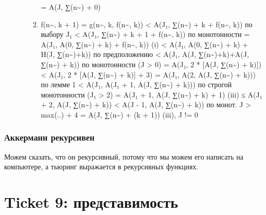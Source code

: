 \documentclass[11pt]{article}
\begin{document}
\begin{itemize}
\begin{enumerate}
\begin{enumerate}
= A(J, ∑(n\textasciitilde{}) + 0)
\item f(n\textasciitilde{}, k + 1)
= g(n\textasciitilde{}, k, f(n\textasciitilde{}, k))
< A(J₁, ∑(n\textasciitilde{}) + k + f(n\textasciitilde{}, k))        по выбору J₁
< A(J₁, ∑(n\textasciitilde{}) + k + 1 + f(n\textasciitilde{}, k))    по монотонности
= A(J₁, A(0, ∑(n\textasciitilde{}) + k) + f(n\textasciitilde{}, k))  (i)
< A(J₁, A(0, ∑(n\textasciitilde{}) + k) + H(J, ∑(n\textasciitilde{})+k)) по предположению
< A(J₁, A(J, ∑(n\textasciitilde{})+k)+A(J, ∑(n\textasciitilde{}) + k)) по монотонности (J > 0)
= A(J₁, 2 * [A(J, ∑(n\textasciitilde{}) + k)])
< A(J₁, 2 * [A(J, ∑(n\textasciitilde{}) + k)] + 3)
= A(J₁, A(2, A(J, ∑(n\textasciitilde{}) + k)))        по лемме 1
< A(J₁, A(J₁ + 1, A(J, ∑(n\textasciitilde{}) + k)))   по строгой монотонности (J₁ > 2)
= A(J₁ + 1, A(J, ∑(n\textasciitilde{}) + k) + 1)      (iii)
≤ A(J₁ + 2, A(J, ∑(n\textasciitilde{}) + k))
< A(J - 1, A(J, ∑(n\textasciitilde{}) + k))           по монот. J > max(..) + 4
= A(J, ∑(n\textasciitilde{}) + (k + 1))               (iii), J != 0
\end{enumerate}
\end{enumerate}
\end{itemize}
\subsubsection{Аккерманн рекурсивен}
\label{sec-10-3-11}
Можем сказать, что он рекурсивный, потому что мы можем
его написать на компьютере, а тьюринг выражается в рекурсивных функциях.
\section{Ticket 9: представимость}
\label{sec-11}
\end{document}
